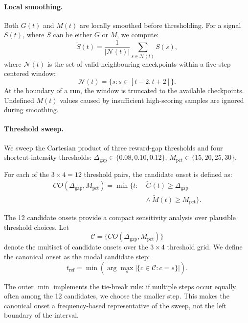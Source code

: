 \documentclass[11pt]{article}
\begin{document}
\paragraph{Local smoothing.}
Both \(G(t)\) and \(M(t)\) are locally smoothed before thresholding. For a signal \(S(t)\), where \(S\) can be either \(G\) or \(M\), we compute:
\begin{equation}
\widetilde{S}(t)=
\frac{1}{|\mathcal{N}(t)|}
\sum_{s\in \mathcal{N}(t)} S(s),
\end{equation}
where \(\mathcal{N}(t)\) is the set of valid neighbouring checkpoints within a five-step centered window:
\[
\mathcal{N}(t)=\{s:s\in[t-2,t+2]\}.
\]
At the boundary of a run, the window is truncated to the available checkpoints. Undefined \(M(t)\) values caused by insufficient high-scoring samples are ignored during smoothing.

\paragraph{Threshold sweep.}
We sweep the Cartesian product of three reward-gap thresholds and four shortcut-intensity thresholds:
$\Delta_{\mathrm{gap}} \in \{0.08, 0.10, 0.12\}$, $M_{\mathrm{pct}} \in \{15, 20, 25, 30\}$.

For each of the \(3\times4=12\) threshold pairs, the candidate onset is defined as:
\begin{equation}
\begin{aligned}
CO(\Delta_{\mathrm{gap}},M_{\mathrm{pct}})
=\min\{t:\;&\widetilde{G}(t)\ge\Delta_{\mathrm{gap}} \\
&\land\ \widetilde{M}(t)\ge M_{\mathrm{pct}}\}.
\end{aligned}
\end{equation}

The 12 candidate onsets provide a compact sensitivity analysis over plausible threshold choices. Let
\[
\mathcal{C}=\{CO(\Delta_{\mathrm{gap}},M_{\mathrm{pct}})\}
\]
denote the multiset of candidate onsets over the \(3\times4\) threshold grid. We define the canonical onset as the modal candidate step:
\begin{equation}
t_{\mathrm{ref}}
=
\min\left(
\arg\max_{s}
\left|\{c\in\mathcal{C}:c=s\}\right|
\right).
\end{equation}

The outer \(\min\) implements the tie-break rule: if multiple steps occur equally often among the 12 candidates, we choose the smaller step. This makes the canonical onset a frequency-based representative of the sweep, not the left boundary of the interval.
\end{document}

